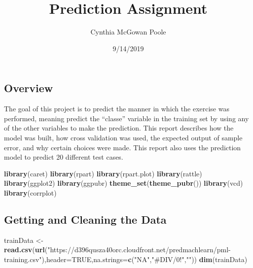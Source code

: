 \documentclass[]{article}
\title{Prediction Assignment}
\author{Cynthia McGowan Poole}
\date{9/14/2019}
\newenvironment{Shaded}{\begin{snugshade}}{\end{snugshade}}
\newcommand{\DataTypeTok}[1]{\textcolor[rgb]{0.13,0.29,0.53}{#1}}
\newcommand{\KeywordTok}[1]{\textcolor[rgb]{0.13,0.29,0.53}{\textbf{#1}}}
\newcommand{\NormalTok}[1]{#1}
\newcommand{\OtherTok}[1]{\textcolor[rgb]{0.56,0.35,0.01}{#1}}
\newcommand{\StringTok}[1]{\textcolor[rgb]{0.31,0.60,0.02}{#1}}
\begin{document}
\maketitle

\hypertarget{overview}{%
\subsection{Overview}\label{overview}}

The goal of this project is to predict the manner in which the exercise
was performed, meaning predict the ``classe'' variable in the training
set by using any of the other variables to make the prediction. This
report describes how the model was built, how cross validation was used,
the expected output of sample error, and why certain choices were made.
This report also uses the prediction model to predict 20 different test
cases.

\begin{Shaded}
\begin{Highlighting}[]
\KeywordTok{library}\NormalTok{(caret)}
\KeywordTok{library}\NormalTok{(rpart)}
\KeywordTok{library}\NormalTok{(rpart.plot)}
\KeywordTok{library}\NormalTok{(rattle)}
\KeywordTok{library}\NormalTok{(ggplot2)}
\KeywordTok{library}\NormalTok{(ggpubr)}
\KeywordTok{theme_set}\NormalTok{(}\KeywordTok{theme_pubr}\NormalTok{())}
\KeywordTok{library}\NormalTok{(vcd)}
\KeywordTok{library}\NormalTok{(corrplot)}
\end{Highlighting}
\end{Shaded}

\hypertarget{getting-and-cleaning-the-data}{%
\subsection{Getting and Cleaning the
Data}\label{getting-and-cleaning-the-data}}

\begin{Shaded}
\begin{Highlighting}[]
\NormalTok{trainData <-}\StringTok{ }\KeywordTok{read.csv}\NormalTok{(}\KeywordTok{url}\NormalTok{(}\StringTok{"https://d396qusza40orc.cloudfront.net/predmachlearn/pml-training.csv"}\NormalTok{),}\DataTypeTok{header=}\OtherTok{TRUE}\NormalTok{,}\DataTypeTok{na.strings=}\KeywordTok{c}\NormalTok{(}\StringTok{"NA"}\NormalTok{,}\StringTok{"#DIV/0!"}\NormalTok{,}\StringTok{""}\NormalTok{))}
\KeywordTok{dim}\NormalTok{(trainData)}
\end{Highlighting}
\end{Shaded}
\end{document}
